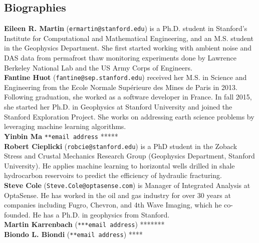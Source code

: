 \documentclass[11pt]{article}
\begin{document}
\subsection*{Biographies}
\small
\vspace{-0.2cm}
\textbf{Eileen R. Martin} (\texttt{ermartin@stanford.edu}) is a Ph.D. student in Stanford's Institute for Computational and Mathematical Engineering, and an M.S. student in the Geophysics Department. She first started working with ambient noise and DAS data from permafrost thaw monitoring experiments done by Lawrence Berkeley National Lab and the US Army Corps of Engineers.
\\
\textbf{Fantine Huot} (\texttt{fantine@sep.stanford.edu}) received her M.S. in Science and Engineering from the Ecole Normale Sup\'erieure des Mines de Paris in 2013. Following graduation, she worked as a software developer in France. In fall 2015, she started her Ph.D. in Geophysics at Stanford University and joined the Stanford Exploration Project. She works on addressing earth science problems by leveraging machine learning algorithms.
\\
\textbf{Yinbin Ma} \texttt{**email address} *****
\\
\textbf{Robert Cieplicki} (\texttt{robcie@stanford.edu}) is a PhD student in the Zoback Stress and Crustal Mechanics Research Group (Geophysics Department, Stanford University). He applies machine learning to horizontal wells drilled in shale hydrocarbon reservoirs to predict the efficiency of hydraulic fracturing.
\\
\textbf{Steve Cole} (\texttt{Steve.Cole@optasense.com}) is Manager of Integrated Analysis at OptaSense. He has worked in the oil and gas industry for over 30 years at companies including Fugro, Chevron, and 4th Wave Imaging, which he co-founded. He has a Ph.D. in geophysics from Stanford.
\\
\textbf{Martin Karrenbach} (\texttt{***email address}) *******
\\
\textbf{Biondo L. Biondi} (\texttt{**email address}) ****
\end{document}
